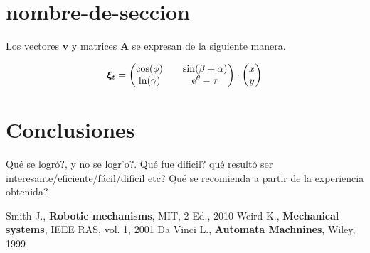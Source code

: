 \documentclass[spanish,10pt,letterpaper, twocolumn]{article}
\begin{document}
\section{nombre-de-seccion}
Los vectores $\mathbf{v}$ y matrices $\mathbf{A}$ se expresan de la siguiente manera.

\begin{equation}
\bm{\xi}_t =
\begin{pmatrix}
\cos(\phi) && \sin(\beta+\alpha)\\
\ln(\gamma) && {\rm e}^\theta-\tau
\end{pmatrix}
\cdot
\begin{pmatrix}
x\\
y
\end{pmatrix}
\end{equation}

\section{Conclusiones}
Qu\'e se logr\'o?, y no se logr'o?. Qu\'e fue dificil? qu\'e result\'o ser interesante/eficiente/f\'acil/dificil etc? Qu\'e se recomienda a partir de la experiencia obtenida?

\begin{thebibliography}{10}
 Smith J., \textbf{Robotic mechanisms}, MIT, 2 Ed., 2010
 Weird K., \textbf{Mechanical systems}, IEEE RAS, vol. 1, 2001
 Da Vinci L., \textbf{Automata Machnines}, Wiley, 1999
\end{thebibliography}
\end{document}
